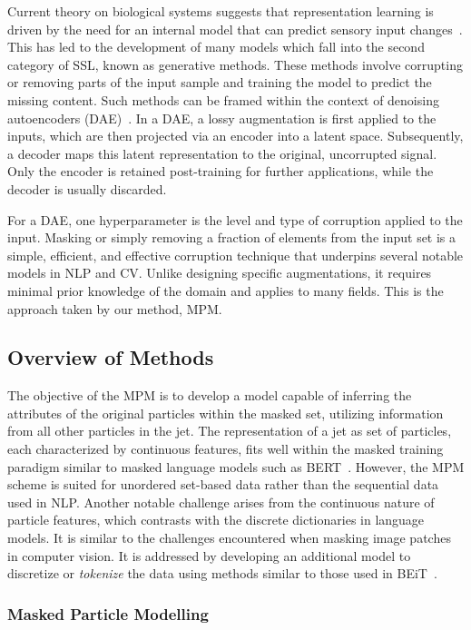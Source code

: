 Current theory on biological systems suggests that representation learning is driven by the need for an internal model that can predict sensory input changes~\cite{cognitivelearning}.
This has led to the development of many models which fall into the second category of SSL, known as generative methods.
These methods involve corrupting or removing parts of the input sample and training the model to predict the missing content.
Such methods can be framed within the context of denoising autoencoders (DAE)~\cite{DAE}.
In a DAE, a lossy augmentation is first applied to the inputs, which are then projected via an encoder into a latent space.
Subsequently, a decoder maps this latent representation to the original, uncorrupted signal.
Only the encoder is retained post-training for further applications, while the decoder is usually discarded.

For a DAE, one hyperparameter is the level and type of corruption applied to the input.
Masking or simply removing a fraction of elements from the input set is a simple, efficient, and effective corruption technique that underpins several notable models in NLP and CV.
Unlike designing specific augmentations, it requires minimal prior knowledge of the domain and applies to many fields.
This is the approach taken by our method, MPM.

\subsection{Overview of Methods}

The objective of the MPM is to develop a model capable of inferring the attributes of the original particles within the masked set, utilizing information from all other particles in the jet.
The representation of a jet as set of particles, each characterized by continuous features, fits well within the masked training paradigm similar to masked language models such as BERT~\cite{BERT}.
However, the MPM scheme is suited for unordered set-based data rather than the sequential data used in NLP.
Another notable challenge arises from the continuous nature of particle features, which contrasts with the discrete dictionaries in language models.
It is similar to the challenges encountered when masking image patches in computer vision.
It is addressed by developing an additional model to discretize or \textit{tokenize} the data using methods similar to those used in BEiT~\cite{BEIT}.

\subsubsection{Masked Particle Modelling}
\label{subsec:mpm}

